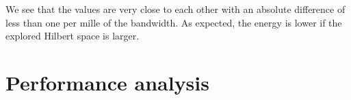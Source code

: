 \begin{table}[ht]
    \caption{
        Ground state energy $E_0$ of the half-filled Anderson impurity model at $U=2D$
        on 101 bath sites for parameters $L$, $p$.
        The energy difference is less than one per mille of the half-bandwidth $D$
        of the conduction electrons.
    }%
    \label{tab:ground-state-energy}
    \centering
\end{table}
We see that the values are very close to each other with an absolute difference
of less than one per mille of the bandwidth.
As expected, the energy is lower if the explored Hilbert space is larger.

\section{Performance analysis}

